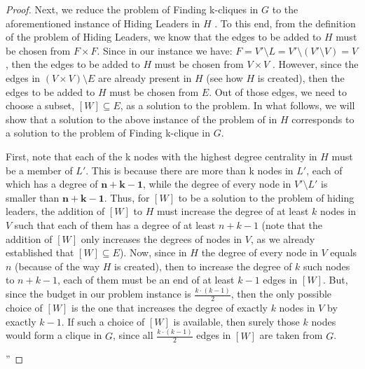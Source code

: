 \begin{proof}
{    Next, we reduce the problem of Finding k-cliques in $G$ to the aforementioned instance of Hiding
    Leaders in $H$ . To this end, from the definition of the problem of Hiding Leaders, we know that the
    edges to be added to $H$ must be chosen from $F \times F$. Since in our instance we have:
    $F = V' \setminus L = V' \setminus (V' \setminus V ) = V$, then the edges to be added to $H$ must be chosen
    from $V \times V$ . However, since the edges in $(V \times V ) \setminus E$ are already present in $H$
    (see how $H$ is created), then the edges to be added to $H$ must be chosen from $E$.
    Out of those edges, we need to choose a subset, $[W] \subseteq E$, as a solution to the problem.
    In what follows, we will show that a solution to the above instance of the problem of \HL in $H$ corresponds
    to a solution to the problem of Finding k-clique in $G$.

    First, note that each of the k nodes with the highest degree centrality in $H$ must be a member of
    $L'$. This is because there are more than k nodes in $L'$, each of which has a degree of $\boldsymbol{n+k-1}$, while
    the degree of every node in $V' \setminus L'$ is smaller than $\boldsymbol{n + k - 1}$. Thus, for $[W]$
    to be a solution to the problem of hiding leaders, the addition of $[W]$ to $H$ must increase
    the degree of at least $k$ nodes in $V$ such that each of them has a degree of at least $n + k - 1$
    (note that the addition of $[W]$ only increases the degrees of nodes in $V$, as we already established
    that $[W] \subseteq E$). Now, since in $H$ the degree of every node in $V$ equals $n$
    (because of the way $H$ is created), then to increase the degree of $k$ such nodes to $n + k - 1$, each of them
    must be an end of at least $k - 1$ edges in $[W]$. But, since the budget in our problem instance is
    $\frac{k\cdot(k-1)}{2}$, then the only possible choice of $[W]$ is the one that increases the
    degree of exactly $k$ nodes in $V$ by exactly $k - 1$. If such a choice of $[W]$ is available, then surely
    those $k$ nodes would form a clique in $G$, since all $\frac{k\cdot(k-1)}{2}$ edges in $[W]$ are taken from $G$.
    }''
\end{proof}


